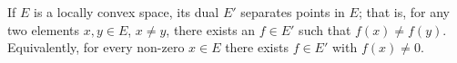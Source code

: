 If $E$ is a locally convex space, its dual $E'$ separates points in $E$; that is, for any two elements $x, y \in E$, $x \neq y$, there exists an $f \in E'$ such that $f(x) \neq f(y)$. Equivalently, for every non-zero $x \in E$ there exists $f \in E'$ with $f(x) \neq 0$.
